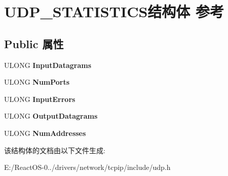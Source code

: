 \hypertarget{struct_u_d_p___s_t_a_t_i_s_t_i_c_s}{}\section{U\+D\+P\+\_\+\+S\+T\+A\+T\+I\+S\+T\+I\+C\+S结构体 参考}
\label{struct_u_d_p___s_t_a_t_i_s_t_i_c_s}
\subsection*{Public 属性}
\begin{DoxyCompactItemize}
\item 
\mbox{\label{struct_u_d_p___s_t_a_t_i_s_t_i_c_s_aadb60d1a588b84c31a96b11ffd9e2c4c}} 
U\+L\+O\+NG {\bfseries Input\+Datagrams}
\item 
\mbox{\label{struct_u_d_p___s_t_a_t_i_s_t_i_c_s_a33084e66b6622f544e6308ce7099b0ac}} 
U\+L\+O\+NG {\bfseries Num\+Ports}
\item 
\mbox{\label{struct_u_d_p___s_t_a_t_i_s_t_i_c_s_a29bcf4333a291db7efb95f9fee6c5833}} 
U\+L\+O\+NG {\bfseries Input\+Errors}
\item 
\mbox{\label{struct_u_d_p___s_t_a_t_i_s_t_i_c_s_acb90eac55cc60e9ca5bb490cff82374b}} 
U\+L\+O\+NG {\bfseries Output\+Datagrams}
\item 
\mbox{\label{struct_u_d_p___s_t_a_t_i_s_t_i_c_s_a242951fec12696fdedae3481c59bf3e7}} 
U\+L\+O\+NG {\bfseries Num\+Addresses}
\end{DoxyCompactItemize}


该结构体的文档由以下文件生成\+:\begin{DoxyCompactItemize}
\item 
E\+:/\+React\+O\+S-\/0../drivers/network/tcpip/include/udp.\+h\end{DoxyCompactItemize}
